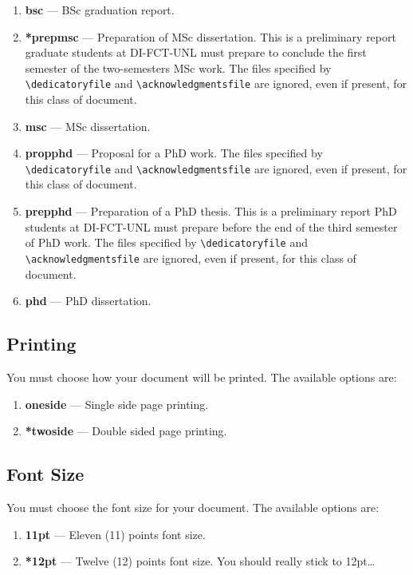 \begin{enumerate}
	\item \textbf{bsc} --- BSc graduation report.
	\item \textbf{*prepmsc} --- Preparation of MSc dissertation. This is a preliminary report graduate students at DI-FCT-UNL must prepare to conclude the first semester of the two-semesters MSc work. The files specified by \verb!\dedicatoryfile! and \verb!\acknowledgmentsfile! are ignored, even if present, for this class of document.
	\item \textbf{msc} --- MSc dissertation.
	\item \textbf{propphd} ---  Proposal for a PhD work. The files specified by \verb!\dedicatoryfile! and \verb!\acknowledgmentsfile! are ignored, even if present, for this class of document.
	\item \textbf{prepphd} ---  Preparation of a PhD thesis. This is a preliminary report PhD students at DI-FCT-UNL must prepare before the end of the third semester of PhD work. The files specified by \verb!\dedicatoryfile! and \verb!\acknowledgmentsfile! are ignored, even if present, for this class of document.
	\item \textbf{phd} --- PhD dissertation.
\end{enumerate}

\subsection{Printing} %
\label{sub:printing}

You must choose how your document will be printed. The available options are:
\begin{enumerate}
	\item \textbf{oneside} --- Single side page printing.
	\item \textbf{*twoside} --- Double sided page printing.
\end{enumerate}

\subsection{Font Size} %
\label{ssec:font_size}

You must choose the font size for your document. The available options are:
\begin{enumerate}
	\item \textbf{11pt} --- Eleven (11) points font size.
	\item \textbf{*12pt} --- Twelve (12) points font size. You should really stick to 12pt\ldots
\end{enumerate}

